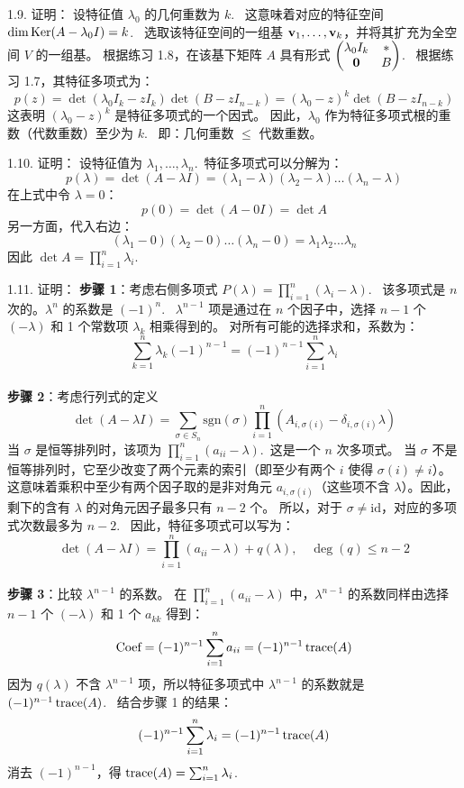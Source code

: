 \begin{exer}
1.9. 证明：
设特征值 $\lambda_0$ 的几何重数为 $k$.~
这意味着对应的特征空间 $\dim \operatorname{Ker}(A-\lambda_0 I) = k$.~
选取该特征空间的一组基 $\mathbf{v}_1, \dots, \mathbf{v}_k$，并将其扩充为全空间 $V$ 的一组基。
根据练习 1.8，在该基下矩阵 $A$ 具有形式 $\begin{pmatrix} \lambda_0 I_k & * \\ \mathbf{0} & B \end{pmatrix}$.~
根据练习 1.7，其特征多项式为：
$$ p(z) = \det(\lambda_0 I_k - z I_k) \det(B - z I_{n-k}) = (\lambda_0 - z)^k \det(B - z I_{n-k}) $$
这表明 $(\lambda_0 - z)^k$ 是特征多项式的一个因式。
因此，$\lambda_0$ 作为特征多项式根的重数（代数重数）至少为 $k$.~
即：几何重数 $\le$ 代数重数。

1.10. 证明：
设特征值为 $\lambda_1, \dots, \lambda_n$.~特征多项式可以分解为：
$$ p(\lambda) = \det(A - \lambda I) = (\lambda_1 - \lambda)(\lambda_2 - \lambda)\dots(\lambda_n - \lambda) $$
在上式中令 $\lambda = 0$：
$$ p(0) = \det(A - 0 I) = \det A $$
另一方面，代入右边：
$$ (\lambda_1 - 0)(\lambda_2 - 0)\dots(\lambda_n - 0) = \lambda_1 \lambda_2 \dots \lambda_n $$
因此 $\det A = \prod_{i=1}^n \lambda_i$.~

1.11. 证明：
\textbf{步骤 1}：考虑右侧多项式 $P(\lambda) = \prod_{i=1}^n (\lambda_i - \lambda)$.~
该多项式是 $n$ 次的。$\lambda^n$ 的系数是 $(-1)^n$.~
$\lambda^{n-1}$ 项是通过在 $n$ 个因子中，选择 $n-1$ 个 $(-\lambda)$ 和 1 个常数项 $\lambda_k$ 相乘得到的。
对所有可能的选择求和，系数为：
$$ \sum_{k=1}^n \lambda_k (-1)^{n-1} = (-1)^{n-1} \sum_{i=1}^n \lambda_i $$
\\
\textbf{步骤 2}：考虑行列式的定义
$$ \det(A-\lambda I) = \sum_{\sigma \in S_n} \text{sgn}(\sigma) \prod_{i=1}^n (A_{i, \sigma(i)} - \delta_{i, \sigma(i)}\lambda) $$
当 $\sigma$ 是恒等排列时，该项为 $\prod_{i=1}^n (a_{ii} - \lambda)$.~这是一个 $n$ 次多项式。
当 $\sigma$ 不是恒等排列时，它至少改变了两个元素的索引（即至少有两个 $i$ 使得 $\sigma(i) \neq i$）。这意味着乘积中至少有两个因子取的是非对角元 $a_{i, \sigma(i)}$（这些项不含 $\lambda$）。因此，剩下的含有 $\lambda$ 的对角元因子最多只有 $n-2$ 个。
所以，对于 $\sigma \neq \text{id}$，对应的多项式次数最多为 $n-2$.~
因此，特征多项式可以写为：
$$ \det(A-\lambda I) = \prod_{i=1}^n (a_{ii} - \lambda) + q(\lambda), \quad \deg(q) \le n-2 $$
\\
\textbf{步骤 3}：比较 $\lambda^{n-1}$ 的系数。
在 $\prod_{i=1}^n (a_{ii} - \lambda)$ 中，$\lambda^{n-1}$ 的系数同样由选择 $n-1$ 个 $(-\lambda)$ 和 1 个 $a_{kk}$ 得到：
$$ \text{Coef} = (-1)^{n-1} \sum_{i=1}^n a_{ii} = (-1)^{n-1} \operatorname{trace}(A) $$
因为 $q(\lambda)$ 不含 $\lambda^{n-1}$ 项，所以特征多项式中 $\lambda^{n-1}$ 的系数就是 $(-1)^{n-1} \operatorname{trace}(A)$.~
结合步骤 1 的结果：
$$ (-1)^{n-1} \sum_{i=1}^n \lambda_i = (-1)^{n-1} \operatorname{trace}(A) $$
消去 $(-1)^{n-1}$，得 $\operatorname{trace}(A) = \sum_{i=1}^n \lambda_i$.~




\end{exer}
